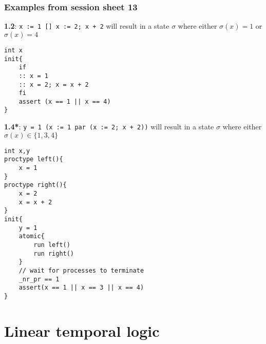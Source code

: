 \documentclass[11.5pt]{article}
\begin{document}
\subsubsection{Examples from session sheet 13}
\textbf{1.2}: \texttt{x := 1 [] x := 2; x + 2} will result in a state $\sigma$ where either $\sigma(x)=1$ or $\sigma(x)=4$  
\begin{verbatim}
int x
init{
    if 
    :: x = 1
    :: x = 2; x = x + 2
    fi
    assert (x == 1 || x == 4)
}
\end{verbatim}
\textbf{1.4*}: \texttt{y = 1 (x := 1 par (x := 2; x + 2))} will result in a state $\sigma$ where either $\sigma(x)\in \{1,3,4\}$ 
\begin{verbatim}
int x,y
proctype left(){
    x = 1
}
proctype right(){
    x = 2
    x = x + 2
}
init{
    y = 1
    atomic{
        run left()
        run right() 
    }
    // wait for processes to terminate
    _nr_pr == 1
    assert(x == 1 || x == 3 || x == 4)
}
\end{verbatim}

\section{Linear temporal logic}
\end{document}
